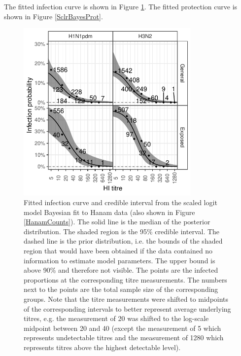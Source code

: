\documentclass[12pt]{article}
\begin{document}
The fitted infection curve is shown in Figure \ref{SclrBayesInf}. The fitted protection curve is shown in Figure \ref{SclrBayesProt}.

\begin{figure}[htp]
	\centering
	\includegraphics[width=0.8\textwidth]{../fit-bayesian-plot/infection_light.pdf}
	\caption{
	Fitted infection curve and credible interval from the scaled logit model Bayesian fit to Hanam data (also shown in Figure \ref{HanamCounts}). The solid line is the median of the posterior distribution. The shaded region is the 95\% credible interval. The dashed line is the prior distribution, i.e. the bounds of the shaded region that would have been obtained if the data contained no information to estimate model parameters. The upper bound is above 90\% and therefore not visible. The points are the infected proportions at the corresponding titre measurements. The numbers next to the points are the total sample size of the corresponding groups. Note that the titre measurements were shifted to midpoints of the corresponding intervals to better represent average underlying titres, e.g. the measurement of 20 was shifted to the log-scale midpoint between 20 and 40 (except the measurement of 5 which represents undetectable titres and the measurement of 1280 which represents titres above the highest detectable level).
	}
	\label{SclrBayesInf}
\end{figure}

\pagebreak
\end{document}
